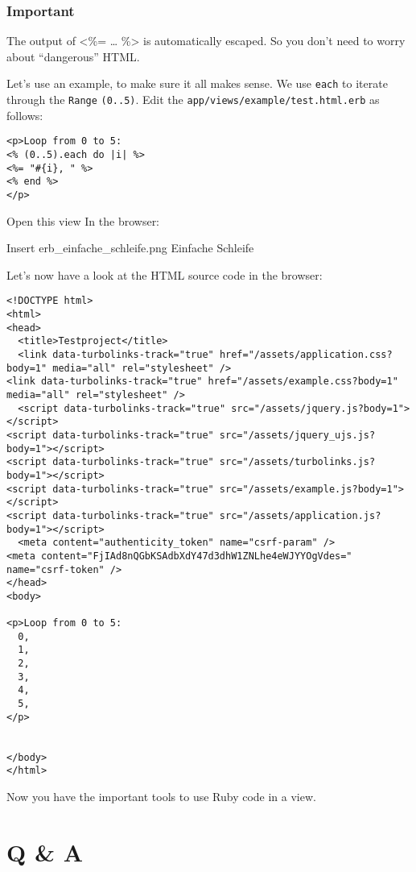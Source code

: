 \documentclass[a4paper]{book}
\newcommand{\chap}[1]{\newpage\thispagestyle{empty}\chapter{#1}\label{chap:\thechapter}}
\begin{document}
\subsection{Important}\label{important-6}

The output of \textless{}\%= \ldots{} \%\textgreater{} is automatically escaped. So you don't need to worry about “dangerous” HTML.

Let's use an example, to make sure it all makes sense. We use \texttt{each} to iterate through the \texttt{Range} \texttt{(0..5)}. Edit the \texttt{app/views/example/test.html.erb} as follows:

\begin{shaded}\begin{verbatim}
<p>Loop from 0 to 5:
<% (0..5).each do |i| %>
<%= "#{i}, " %>
<% end %>
</p>
\end{verbatim}\end{shaded}

Open this view In the browser:

Insert erb\_einfache\_schleife.png Einfache Schleife

Let's now have a look at the HTML source code in the browser:

\begin{shaded}\begin{verbatim}
<!DOCTYPE html>
<html>
<head>
  <title>Testproject</title>
  <link data-turbolinks-track="true" href="/assets/application.css?body=1" media="all" rel="stylesheet" />
<link data-turbolinks-track="true" href="/assets/example.css?body=1" media="all" rel="stylesheet" />
  <script data-turbolinks-track="true" src="/assets/jquery.js?body=1"></script>
<script data-turbolinks-track="true" src="/assets/jquery_ujs.js?body=1"></script>
<script data-turbolinks-track="true" src="/assets/turbolinks.js?body=1"></script>
<script data-turbolinks-track="true" src="/assets/example.js?body=1"></script>
<script data-turbolinks-track="true" src="/assets/application.js?body=1"></script>
  <meta content="authenticity_token" name="csrf-param" />
<meta content="FjIAd8nQGbKSAdbXdY47d3dhW1ZNLhe4eWJYYOgVdes=" name="csrf-token" />
</head>
<body>

<p>Loop from 0 to 5:
  0,
  1,
  2,
  3,
  4,
  5,
</p>


</body>
</html>
\end{verbatim}\end{shaded}

Now you have the important tools to use Ruby code in a view.

\chap{Q \& A}\label{q-a}
\end{document}

